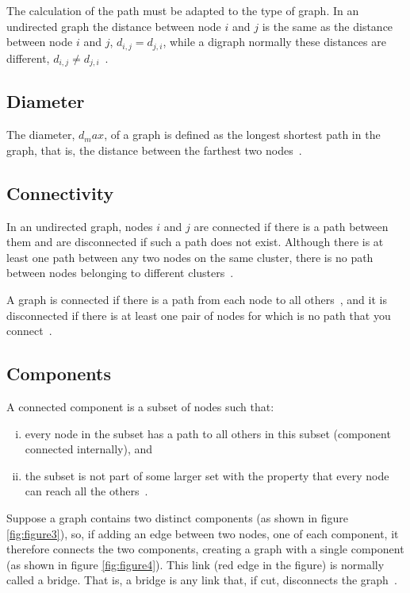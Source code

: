 \documentclass{article}
\begin{document}
\begin{multicols}{2}
The calculation of the path must be adapted to the type of graph. In an undirected graph the distance between node $i$ and $j$ is the same as the distance between node $i$ and $j$, $d_{i,j}=d_{j,i}$, while a digraph normally these distances are different, $d_{i,j} \neq d_{j,i}$~\cite{NS}.


\subsection{Diameter}

The diameter, $d_max$, of a graph is defined as the longest shortest path in the graph, that is, the distance between the farthest two nodes~\cite{NS}.


\subsection{Connectivity}

In an undirected graph, nodes $i$ and $j$ are connected if there is a path between them and are disconnected if such a path does not exist. Although there is at least one path between any two nodes on the same cluster, there is no path between nodes belonging to different clusters~\cite{NS}.

A graph is connected if there is a path from each node to all others~\cite{NCM}, and it is disconnected if there is at least one pair of nodes for which is no path that you connect~\cite{NS}.


\subsection{Components}

A connected component is a subset of nodes such that:

\begin{enumerate}[i.]
\item every node in the subset has a path to all others in this subset (component connected internally), and

\item the subset is not part of some larger set with the property that every node can reach all the others~\cite{NCM}.
\end{enumerate}

Suppose a graph contains two distinct components (as shown in figure \ref{fig:figure3}), so, if adding an edge between two nodes, one of each component, it therefore connects the two components, creating a graph with a single component (as shown in figure \ref{fig:figure4}). This link (red edge in the figure) is normally called a bridge. That is, a bridge is any link that, if cut, disconnects the graph~\cite{NS}.



\end{multicols}
\end{document}
